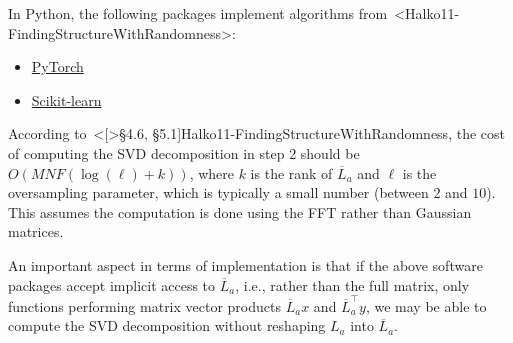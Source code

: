 \documentclass[a4paper,11pt]{article}
\def\cite#1{<#1>}%
\begin{document}
In Python, the following packages implement algorithms
from~\cite{Halko11-FindingStructureWithRandomness}:
\begin{itemize}
	\item \href{https://docs.pytorch.org/docs/stable/generated/torch.svd_lowrank.html}{PyTorch}

	\item \href{https://scikit-learn.org/stable/modules/generated/sklearn.utils.extmath.randomized_svd.html#rf38c2b656ebc-1}{Scikit-learn}
\end{itemize}
According to~\cite[\S4.6, \S5.1]{Halko11-FindingStructureWithRandomness}, the
cost of computing the SVD decomposition in step 2 should be $O(MNF(\log(\ell) +
	k))$, where $k$ is the rank of $\overline{L}_a$ and $\ell$ is the oversampling parameter,
which is typically a small number (between $2$ and $10$).
This assumes the computation is done using the FFT rather than Gaussian
matrices.

\begin{Remark}
	An important aspect in terms of implementation is that if the above software
	packages accept implicit access to $\overline{L}_a$, i.e., rather than the full
	matrix, only functions performing matrix vector products $\overline{L}_a x$ and
	$\overline{L}_a ^\top y$, we may be able to compute the SVD decomposition
	without reshaping $L_a$ into $\overline{L}_a$.
\end{Remark}
\end{document}
